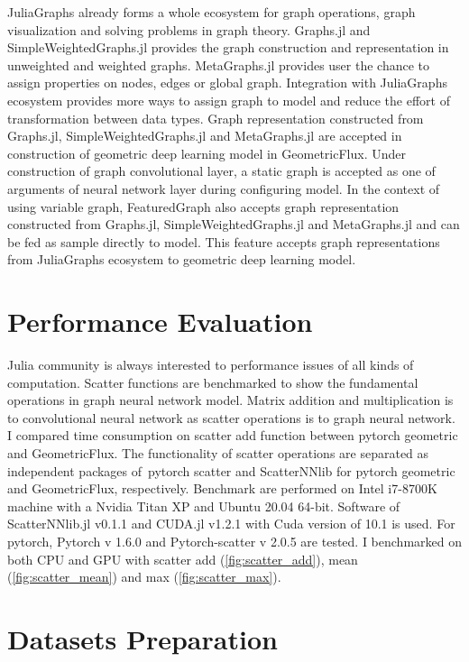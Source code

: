 \documentclass{juliacon}
\begin{document}
JuliaGraphs already forms a whole ecosystem for graph operations, graph visualization and
solving problems in graph theory. Graphs.jl and SimpleWeightedGraphs.jl provides the
graph construction and representation in unweighted and weighted graphs.
MetaGraphs.jl provides user the chance to assign properties on nodes, edges or global graph.
Integration with JuliaGraphs ecosystem provides more ways to assign graph to model and
reduce the effort of transformation between data types. Graph representation constructed
from Graphs.jl, SimpleWeightedGraphs.jl and MetaGraphs.jl are accepted in construction
of geometric deep learning model in GeometricFlux. Under construction of graph convolutional
layer, a static graph is accepted as one of arguments of neural network layer during
configuring model. In the context of using variable graph, FeaturedGraph also accepts graph
representation constructed from Graphs.jl, SimpleWeightedGraphs.jl and MetaGraphs.jl
and can be fed as sample directly to model. This feature accepts graph representations
from JuliaGraphs ecosystem to geometric deep learning model.

\section{Performance Evaluation}

Julia community is always interested to performance issues of all kinds of computation.
Scatter functions are benchmarked to show the fundamental operations in graph neural network
model. Matrix addition and multiplication is to convolutional neural network as scatter
operations is to graph neural network. I compared time consumption on scatter add function
between pytorch geometric and GeometricFlux. The functionality of scatter operations are
separated as independent packages of pytorch scatter and ScatterNNlib for pytorch geometric
and GeometricFlux, respectively. Benchmark are performed on Intel i7-8700K machine with a
Nvidia Titan XP and Ubuntu 20.04 64-bit. Software of ScatterNNlib.jl v0.1.1 and CUDA.jl v1.2.1
with Cuda version of 10.1 is used. For pytorch, Pytorch v 1.6.0 and Pytorch-scatter v 2.0.5
are tested. I benchmarked on both CPU and GPU with scatter add (\autoref{fig:scatter_add}), mean (\autoref{fig:scatter_mean})
and max (\autoref{fig:scatter_max}).

\section{Datasets Preparation}
\end{document}
